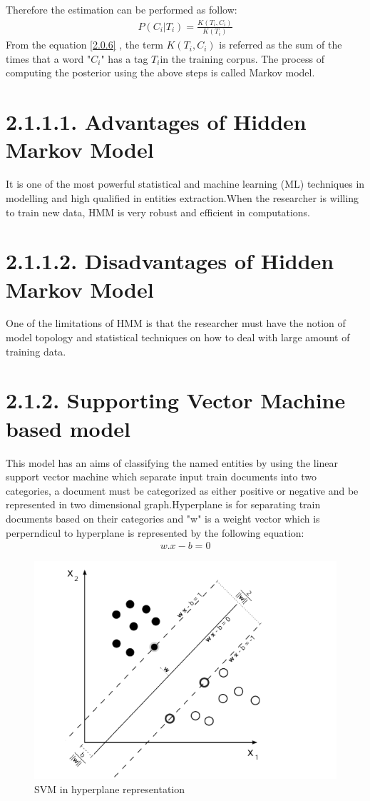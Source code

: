 Therefore the estimation can be performed as follow:
\begin{align}
P(C_{i}|T_{i}) =  \frac{K(T_{i},C_{i})}{K(T_{i})} \label{2.0.6}
\end{align}
From the equation \eqref{2.0.6} , the term $K(T_{i},C_{i})$  is referred as the sum of the times that a word "$C_{i}$" has a tag $T_{i}$in the training corpus.
The process of computing the posterior using the above steps is called Markov model.
\section*{2.1.1.1. Advantages of Hidden Markov Model}
It is one of the most powerful statistical and machine learning (ML) techniques in modelling and high qualified in entities extraction.When the researcher is willing to train new data, HMM is very robust and efficient in computations.
\section*{2.1.1.2. Disadvantages of Hidden Markov Model}
One of the limitations of HMM is that the researcher must have the notion of model topology and statistical techniques on how to deal with large amount of training data.
\section*{2.1.2.  Supporting Vector Machine based model}
This model has an aims of classifying the named entities by using the linear support vector machine which separate input train documents into two categories, a document must be categorized as either positive or negative and be represented in two dimensional graph.Hyperplane is for separating train documents based on their categories and "w" is a weight vector  which is perperndicul to hyperplane is represented by the following equation: 
\begin{align}
w.x- b = 0 \label{2.0.7}
\end{align}
\begin{figure}[hbtp]
\caption{SVM in hyperplane representation}
\centering
\includegraphics[scale=.7]{images/svm.png}
\end{figure}

